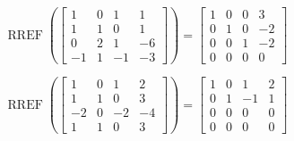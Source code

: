 \documentclass{article}
\DeclareMathOperator{\RREF}{RREF}
\begin{document}
%
%




\[  \RREF\left(\begin{bmatrix}
    1 & 0 & 1 & 1 \\
    1 & 1 & 0 & 1 \\
    0 & 2 & 1 & -6 \\
    -1 & 1 & -1 & -3  
  \end{bmatrix} \right) =
  \begin{bmatrix}
    1 & 0 & 0 & 3 \\
    0 & 1 & 0 & -2 \\
    0 & 0 & 1 & -2 \\
    0 & 0 & 0 & 0 
  \end{bmatrix}
\]

\[
  \RREF\left(\begin{bmatrix}
    1 & 0 & 1 & 2 \\
    1 & 1 & 0 & 3 \\
    -2 & 0 & -2 & -4 \\
    1 & 1 & 0 & 3
  \end{bmatrix} \right) =
  \begin{bmatrix}
    1 & 0 & 1 & 2 \\
    0 & 1 & -1 & 1 \\
    0 & 0 & 0 & 0 \\
    0 & 0 & 0 & 0 
  \end{bmatrix}
\]
\end{document}
